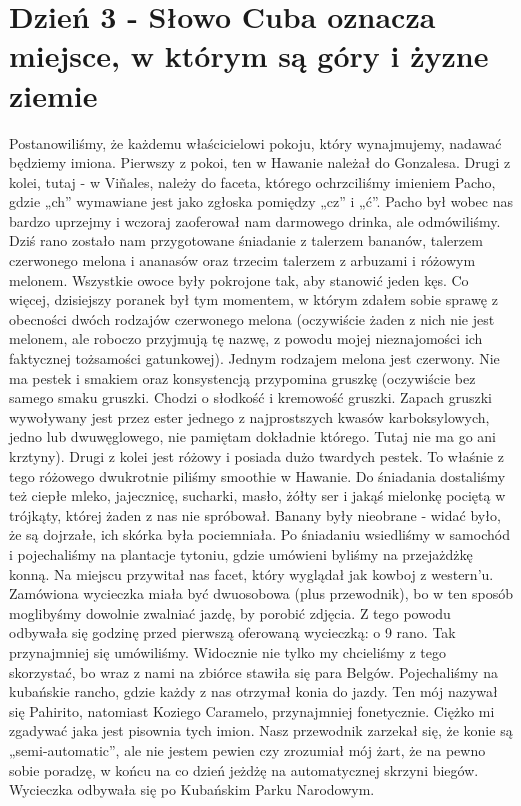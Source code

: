 
\chapter[Słowo Cuba oznacza miejsce, w którym są góry i żyzne ziemie]{Dzień 3 - Słowo Cuba oznacza miejsce, w którym są góry i żyzne ziemie}

Postanowiliśmy, że każdemu właścicielowi pokoju, który wynajmujemy, nadawać będziemy imiona.
Pierwszy z pokoi, ten w Hawanie należał do Gonzalesa.
Drugi z kolei, tutaj - w Viñales, należy do faceta, którego ochrzciliśmy imieniem Pacho, gdzie „ch” wymawiane jest jako zgłoska pomiędzy „cz” i „ć”.
Pacho był wobec nas bardzo uprzejmy i wczoraj zaoferował nam darmowego drinka, ale odmówiliśmy.
Dziś rano zostało nam przygotowane śniadanie z talerzem bananów, talerzem czerwonego melona i ananasów oraz trzecim talerzem z arbuzami i różowym melonem.
Wszystkie owoce były pokrojone tak, aby stanowić jeden kęs.
Co więcej, dzisiejszy poranek był tym momentem, w którym zdałem sobie sprawę z obecności dwóch rodzajów czerwonego melona (oczywiście żaden z nich nie jest melonem, ale roboczo przyjmują tę nazwę, z powodu mojej nieznajomości ich faktycznej tożsamości gatunkowej).
Jednym rodzajem melona jest czerwony.
Nie ma pestek i smakiem oraz konsystencją przypomina gruszkę (oczywiście bez samego smaku gruszki.
Chodzi o słodkość i kremowość gruszki.
Zapach gruszki wywoływany jest przez ester jednego z najprostszych kwasów karboksylowych, jedno lub dwuwęglowego, nie pamiętam dokładnie którego.
Tutaj nie ma go ani krztyny).
Drugi z kolei jest różowy i posiada dużo twardych pestek.
To właśnie z tego różowego dwukrotnie piliśmy smoothie w Hawanie.
Do śniadania dostaliśmy też ciepłe mleko, jajecznicę, sucharki, masło, żółty ser i jakąś mielonkę pociętą w trójkąty, której żaden z nas nie spróbował.
Banany były nieobrane - widać było, że są dojrzałe, ich skórka była pociemniała.
Po śniadaniu wsiedliśmy w samochód i pojechaliśmy na plantacje tytoniu, gdzie umówieni byliśmy na przejażdżkę konną.
Na miejscu przywitał nas facet, który wyglądał jak kowboj z western'u.
Zamówiona wycieczka miała być dwuosobowa (plus przewodnik), bo w ten sposób moglibyśmy dowolnie zwalniać jazdę, by porobić zdjęcia.
Z tego powodu odbywała się godzinę przed pierwszą oferowaną wycieczką: o 9 rano.
Tak przynajmniej się umówiliśmy.
Widocznie nie tylko my chcieliśmy z tego skorzystać, bo wraz z nami na zbiórce stawiła się para Belgów.
Pojechaliśmy na kubańskie rancho, gdzie każdy z nas otrzymał konia do jazdy.
Ten mój nazywał się Pahirito, natomiast Koziego Caramelo, przynajmniej fonetycznie.
Ciężko mi zgadywać jaka jest pisownia tych imion.
Nasz przewodnik zarzekał się, że konie są „semi-automatic”, ale nie jestem pewien czy zrozumiał mój żart, że na pewno sobie poradzę, w końcu na co dzień jeżdżę na automatycznej skrzyni biegów.
Wycieczka odbywała się po Kubańskim Parku Narodowym.


